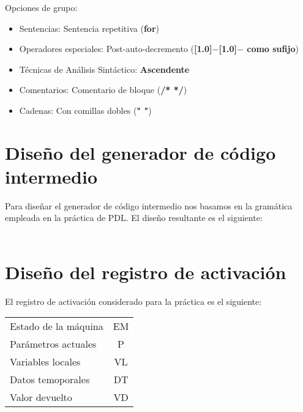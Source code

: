 \documentclass[11pt, , a4paper, titlepage]{article}
\newenvironment{myitemize}
{ \begin{itemize}
    \setlength{\itemsep}{0pt}
    \setlength{\parskip}{2pt}    }
{ \end{itemize}                  }
\newcommand{\minus}{\scalebox{0.75}[1.0]{$-$}}
\begin{document}
Opciones de grupo:
\begin{myitemize}
    \renewcommand{\labelitemi}{$\circ$}
    \item Sentencias: Sentencia repetitiva (\textbf{for})
    \item   Operadores especiales: Post-auto-decremento (\textbf{\minus \minus \hspace{0.1cm} como sufijo})
    \item     Técnicas de Análisis Sintáctico: \textbf{Ascendente}
    \item     Comentarios: Comentario de bloque (\textbf{/* */})
    \item Cadenas: Con comillas dobles (\textbf{" \phantom{} "})
\end{myitemize}
\clearpage

\section{Diseño del generador de código intermedio}


Para diseñar el generador de código intermedio nos basamos en la gramática empleada en la práctica de PDL.
El diseño resultante es el siguiente: \\ \\


\section{Diseño del registro de activación}
El registro de activación considerado para la práctica es el siguiente: \\
\begin{table}[H]
    \centering
    \begin{tabular}{ l c }
    Estado de la máquina & EM \\
    Parámetros actuales  & P  \\
    Variables locales    & VL \\
    Datos temoporales    & DT \\
    Valor devuelto       & VD
    \end{tabular}
\end{table}
\end{document}
